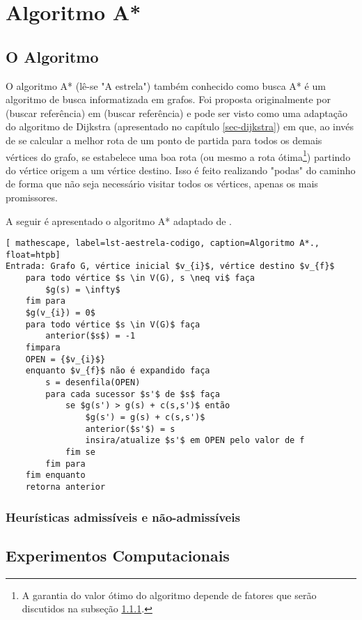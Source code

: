 \chapter{Algoritmo A*}
\label{sec-aestrela}

\section{O Algoritmo}
\label{sec-aestrela-algoritmo}
O algoritmo A* (lê-se "A estrela") também conhecido como busca A* é um algoritmo de busca informatizada em grafos. Foi proposta originalmente por (buscar referência) em (buscar referência) e pode ser visto como uma adaptação do algoritmo de Dijkstra (apresentado no capítulo \ref{sec-dijkstra}) em que, ao invés de se calcular a melhor rota de um ponto de partida para todos os demais vértices do grafo, se estabelece uma boa rota (ou mesmo a rota ótima\footnote{A garantia do valor ótimo do algoritmo depende de fatores que serão discutidos na subseção \ref{sec-aestrela-algoritmo-heuristica}.}) partindo do vértice origem a um vértice destino. Isso é feito realizando "podas" do caminho de forma que não seja necessário visitar todos os vértices, apenas os mais promissores.

A seguir é apresentado o algoritmo A* adaptado de .

\begin{lstlisting}[ mathescape, label=lst-aestrela-codigo, caption=Algoritmo A*., float=htpb]
Entrada: Grafo G, vértice inicial $v_{i}$, vértice destino $v_{f}$
	para todo vértice $s \in V(G), s \neq vi$ faça
		$g(s) = \infty$
	fim para
	$g(v_{i}) = 0$
	para todo vértice $s \in V(G)$ faça
		anterior($s$) = -1
	fimpara
	OPEN = {$v_{i}$}
	enquanto $v_{f}$ não é expandido faça
		s = desenfila(OPEN)
		para cada sucessor $s'$ de $s$ faça
			se $g(s') > g(s) + c(s,s')$ então
				$g(s') = g(s) + c(s,s')$
				anterior($s'$) = s
				insira/atualize $s'$ em OPEN pelo valor de f
			fim se
		fim para
	fim enquanto
	retorna anterior
\end{lstlisting}



\subsection{Heurísticas admissíveis e não-admissíveis}
\label{sec-aestrela-algoritmo-heuristica}  

\section{Experimentos Computacionais}
\label{sec-aestrela-experimentos}

